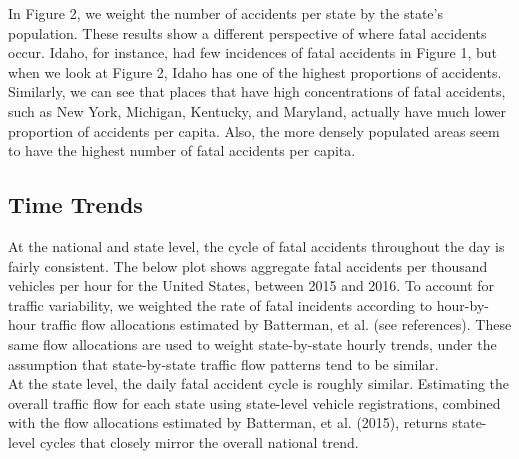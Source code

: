 \documentclass[11pt, oneside,titlepage]{article}   	%
\begin{document}
In Figure 2, we weight the number of accidents per state by the state's population. These results show a different perspective of where fatal accidents occur. Idaho, for instance, had few incidences of fatal accidents in Figure 1, but when we look at Figure 2, Idaho has one of the highest proportions of accidents. Similarly, we can see that places that have high concentrations of fatal accidents, such as New York, Michigan, Kentucky, and Maryland, actually have much lower proportion of accidents per capita. Also, the more densely populated areas seem to have the highest number of fatal accidents per capita.

\subsection*{Time Trends}
At the national and state level, the cycle of fatal accidents throughout the day is fairly consistent. The below plot shows aggregate fatal accidents per thousand vehicles per hour for the United States, between 2015 and 2016. To account for traffic variability, we weighted the rate of fatal incidents according to hour-by-hour traffic flow allocations estimated by Batterman, et al. (see references). These same flow allocations are used to weight state-by-state hourly trends, under the assumption that state-by-state traffic flow patterns tend to be similar. \\

At the state level, the daily fatal accident cycle is roughly similar. Estimating the overall traffic flow for each state using state-level vehicle registrations, combined with the flow allocations estimated by Batterman, et al. (2015), returns state-level cycles that closely mirror the overall national trend.
\end{document}
